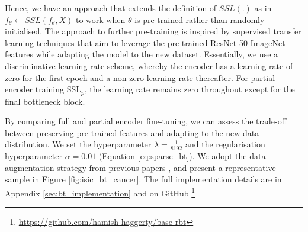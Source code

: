 \documentclass[a4paper,fleqn]{cas-dc}
\begin{document}
Hence, we have an approach that extends the definition of $SSL(.)$ as in $f_{\theta} \leftarrow SSL(f_{\theta},X)$ to work when $\theta$ is pre-trained rather than randomly initialised. The approach to further pre-training is inspired by supervised transfer learning techniques that aim to leverage the pre-trained ResNet-50 ImageNet features while adapting the model to the new dataset. Essentially, we use a discriminative learning rate scheme, whereby the encoder has a learning rate of zero for the first epoch and a non-zero learning rate thereafter. For partial encoder training SSL$_p$, the learning rate remains zero throughout except for the final bottleneck block.

By comparing full and partial encoder fine-tuning, we can assess the trade-off between preserving pre-trained features and adapting to the new data distribution.  
We set the hyperparameter $\lambda=\frac{1}{8192}$ and the regularisation hyperparameter $\alpha=0.01$ (Equation \ref{eq:sparse_bt}). We adopt the data augmentation strategy from previous papers \cite{zbontar2021barlow,grill2020bootstrap}, and present a representative sample in Figure \ref{fig:isic_bt_cancer}. The full implementation details are in  Appendix \ref{sec:bt_implementation} and on GitHub \footnote{\url{https://github.com/hamish-haggerty/base-rbt}}


\end{document}
